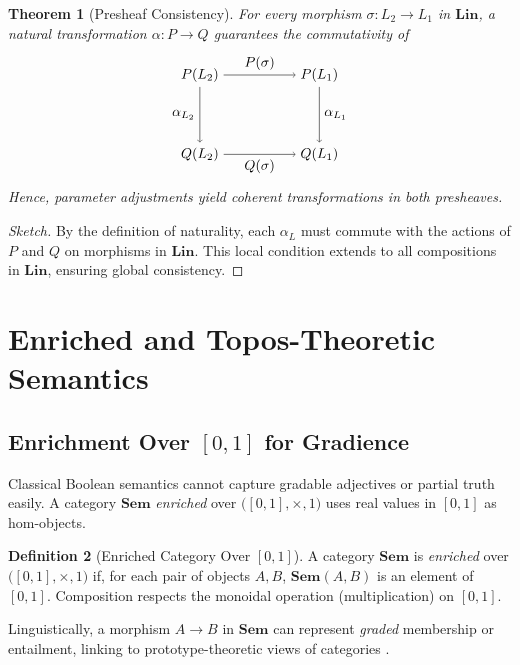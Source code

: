 \documentclass[12pt]{article}
\theoremstyle{plain}
\newtheorem{theorem}{Theorem}[section]
\theoremstyle{definition}
\newtheorem{definition}[theorem]{Definition}
\begin{document}
\begin{theorem}[Presheaf Consistency]\label{thm:PresheafConsistency}
For every morphism \(\sigma: L_2 \to L_1\) in \(\mathbf{Lin}\), a natural transformation \(\alpha : P \to Q\) guarantees the commutativity of
\[
\begin{tikzpicture}[node distance=4em, auto]
  \node (P2) at (0,0) {$P(L_2)$};
  \node (P1) at (3,0) {$P(L_1)$};
  \node (Q2) at (0,-2) {$Q(L_2)$};
  \node (Q1) at (3,-2) {$Q(L_1)$};

  \draw[->] (P2) to node {$P(\sigma)$} (P1);
  \draw[->] (Q2) to node [below] {$Q(\sigma)$} (Q1);
  \draw[->] (P2) to node [left] {$\alpha_{L_2}$} (Q2);
  \draw[->] (P1) to node [right] {$\alpha_{L_1}$} (Q1);
\end{tikzpicture}
\]
Hence, parameter adjustments yield coherent transformations in both presheaves.
\end{theorem}

\begin{proof}[Sketch]
By the definition of naturality, each \(\alpha_{L}\) must commute with the actions of \(P\) and \(Q\) on morphisms in \(\mathbf{Lin}\). This local condition extends to all compositions in \(\mathbf{Lin}\), ensuring global consistency.
\end{proof}

\section{Enriched and Topos-Theoretic Semantics}

\subsection{Enrichment Over \texorpdfstring{$[0,1]$}{[0,1]} for Gradience}
Classical Boolean semantics cannot capture gradable adjectives or partial truth easily. A category \(\mathbf{Sem}\) \emph{enriched} over \(\bigl([0,1], \times, 1\bigr)\) uses real values in \([0,1]\) as hom-objects.

\begin{definition}[Enriched Category Over \texorpdfstring{$[0,1]$}{[0,1]}]
A category \(\mathbf{Sem}\) is \emph{enriched} over \(\bigl([0,1], \times, 1\bigr)\) if, for each pair of objects \(A, B\), \(\mathbf{Sem}(A,B)\) is an element of \([0,1]\). Composition respects the monoidal operation (multiplication) on \([0,1]\).
\end{definition}

Linguistically, a morphism \(A \to B\) in \(\mathbf{Sem}\) can represent \emph{graded} membership or entailment, linking to prototype-theoretic views of categories \cite{Rosch}.
\end{document}
